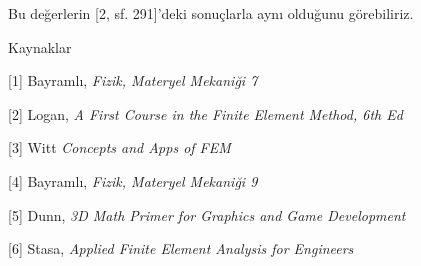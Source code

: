 \documentclass[12pt,fleqn]{article}\usepackage{../../common}
\begin{document}
Bu değerlerin [2, sf. 291]'deki sonuçlarla aynı olduğunu görebiliriz.

Kaynaklar

[1] Bayramlı, {\em Fizik, Materyel Mekaniği 7}

[2] Logan, {\em A First Course in the Finite Element Method, 6th Ed}

[3] Witt {\em Concepts and Apps of FEM}

[4] Bayramlı, {\em Fizik, Materyel Mekaniği 9}

[5] Dunn, {\em 3D Math Primer for Graphics and Game Development}

[6] Stasa, {\em Applied Finite Element Analysis for Engineers}
\end{document}
